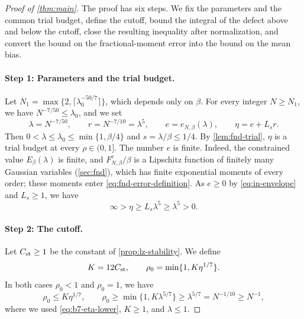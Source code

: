 \begin{proof}[Proof of \cref{thm:main}]
The proof has six steps. We fix the parameters and the common trial
budget, define the cutoff, bound the integral of the defect above and
below the cutoff, close the resulting inequality after normalization,
and convert the bound on the fractional-moment error into the bound on
the mean bias.

\paragraph{Step 1: Parameters and the trial budget.} Let
$N_1=\max\{2,\lceil\lambda_0^{-50/7}\rceil\}$, which depends only on
$\beta$. For every integer $N\ge N_1$, we have $N^{-7/50}\le\lambda_0$,
and we set
\begin{equation}\label{eq:b7-parameters}
 \lambda=N^{-7/50},\qquad r=N^{-7/10}=\lambda^5,\qquad
 e=e_{N,\beta}(\lambda),\qquad \eta=e+L_sr.
\end{equation}
Then $0<\lambda\le\lambda_0\le\min\{1,\beta/4\}$ and
$s=\lambda/\beta\le1/4$. By \cref{lem:fnd-trial}, $\eta$ is a trial
budget at every $\rho\in(0,1]$. The number $e$ is finite. Indeed, the
constrained value $E_\beta(\lambda)$ is finite, and
$F^c_{N,\beta}/\beta$ is a Lipschitz function of finitely many Gaussian
variables (\cref{sec:fnd}), which has finite exponential moments of
every order; these moments enter \eqref{eq:fnd-error-definition}. As
$e\ge0$ by \eqref{eq:in-envelope} and $L_s\ge1$, we have
\begin{equation}\label{eq:b7-eta-lower}
 \infty>\eta\ge L_s\lambda^5\ge\lambda^5>0.
\end{equation}

\paragraph{Step 2: The cutoff.} Let $C_{\rm st}\ge1$ be the constant of
\cref{prop:lz-stability}. We define
\begin{equation}\label{eq:b7-cutoff}
 K=12C_{\rm st},\qquad \rho_0=\min\{1,K\eta^{1/7}\}.
\end{equation}
In both cases $\rho_0<1$ and $\rho_0=1$, we have
\[
 \rho_0\le K\eta^{1/7},\qquad
 \rho_0\ge\min\{1,K\lambda^{5/7}\}\ge\lambda^{5/7}=N^{-1/10}\ge N^{-1},
\]
where we used \eqref{eq:b7-eta-lower}, $K\ge1$, and $\lambda\le1$.


\end{proof}
